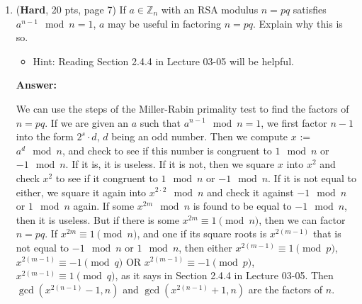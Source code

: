 \documentclass[10pt]{article}
\begin{document}
\begin{enumerate}
    \begin{tabbing}
    for \= k loops: \\
    \> x := $a^d \mod n$ \\
    \> if x \= == $1$ or x == $n-1$: \\
    \> \> continue \\
    \> for s - 1 loops: \\
    \> \> x := $x^2 \mod n$ \\
    \> \> if x \= == $1$: \\
    \> \> \> return "n is not prime" \\
    \> \> if x == $n-1$: \\
    \> \> \> continue (back to k loops) \\
    \> return "n is not prime" \\
    return "n is probably prime" \\
    \end{tabbing}
    
	\bigskip\item (\textbf{Hard}, 20 pts, page 7) If $a\in \mathbb{Z}_n$ with an RSA modulus $n=pq$ satisfies $a^{n - 1} \mod n = 1$, $a$ may be useful in factoring $n=pq$.
    Explain why this is so.
    \begin{itemize}
    \item Hint: Reading Section 2.4.4 in Lecture 03-05 will be helpful.
    \end{itemize}
	
	\textbf{Answer:}
    
    We can use the steps of the Miller-Rabin primality test to find the factors of $n = pq$. 
    If we are given an $a$ such that $a^{n - 1} \mod n = 1$, we first factor $n-1$ into the
    form $2^s \cdot d$, $d$ being an odd number. Then we compute $x$ := $a^d \mod n$, and 
    check to see if this number is congruent to $1 \mod n$ or $-1 \mod n$. If it is, it is useless. 
    If it is not, then we square $x$ into $x^2$ and check $x^2$ to see if it congruent to $1 \mod n$ or
    $-1 \mod n$. If it is not equal to either, we square it again into $x^{2\cdot 2} \mod n$ and check 
    it against $-1 \mod n$ or $1 \mod n$ again. If some $x^{2m} \mod n$ is found to be equal to $-1 \mod n$,
    then it is useless. But if there is some $x^{2m} \equiv 1 \pmod n$, then we can factor $n=pq$.
    If $x^{2m} \equiv 1 \pmod n$, and one if its square roots is $x^{2(m-1)}$ that is not equal to $-1 \mod n$
    or $1 \mod n$, then either $x^{2(m-1)} \equiv 1 \pmod p$, $x^{2(m-1)} \equiv -1 \pmod q$ OR 
    $x^{2(m-1)} \equiv -1 \pmod p$, $x^{2(m-1)} \equiv 1 \pmod q$, as it says in Section 2.4.4 in 
    Lecture 03-05. Then $\gcd(x^{2(n-1)}-1, n)$ and $\gcd(x^{2(n-1)}+1, n)$ are the factors of $n$.
    
    
\end{enumerate}
\end{document}
